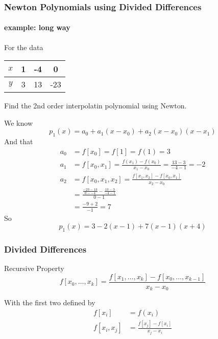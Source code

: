 \documentclass[10pt]{beamer}
\begin{document}
\begin{frame}[shrink]
\frametitle{Newton Polynomials using Divided Differences}
\framesubtitle{example: long way}
\begin{example}
  For the data
  \begin{center}
    \begin{tabular}{c | c c c}
      $x$ & 1 & -4 & 0\\\hline
      $y$ & 3 & 13 & -23\\
    \end{tabular}
  \end{center}
  Find the 2nd order interpolatin polynomial using Newton.
\end{example}
We know
\begin{equation*}
  p_1(x) = a_0  + a_1(x-x_0) + a_2(x-x_0)(x-x_1)
\end{equation*}
And that
\begin{align*}
  a_0 & = f[x_0] = f[1] = f(1) = 3\\
  a_1 & = f[x_0,x_1] = \frac{f(x_1)-f(x_0)}{x_1 - x_0} = \frac{13-3}{-4-1} =
  -2\\
  a_2 & = f[x_0,x_1,x_2] = \frac{f[x_1,x_2]-f[x_0,x_1]}{x_2-x_0}\\
      & = \frac{\frac{-23-13}{0--4} - \frac{13-3}{-4-1}}{0-1}\\
      & = \frac{-9+2}{-1} = 7
\end{align*}
So 
\begin{equation*}
  p_1(x) = 3 -2(x-1) + 7(x-1)(x+4)
\end{equation*}
\end{frame}
\begin{frame}
\frametitle{Divided Differences}
\begin{block}{Recursive Property}
  \begin{equation*}
    f[x_0,\dots,x_k] = \frac{f[x_1,\dots,x_k]-f[x_0,\dots,x_{k-1}]}{x_k -
    x_0}
  \end{equation*}
\end{block}
With the first two defined by
\begin{align*}
  f[x_i] &= f(x_i)\\
  f[x_i,x_j] &= \frac{f[x_j]-f[x_i]}{x_j-x_i}\\
\end{align*}
\end{frame}
\end{document}
